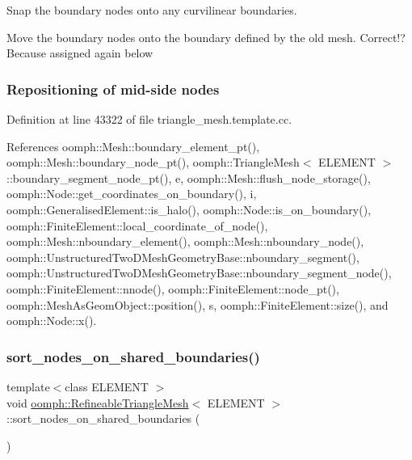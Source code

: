 Snap the boundary nodes onto any curvilinear boundaries. 

Move the boundary nodes onto the boundary defined by the old mesh. Correct!? Because assigned again below 

 \subsubsection*{Repositioning of mid-\/side nodes }

Definition at line 43322 of file triangle\+\_\+mesh.\+template.\+cc.



References oomph\+::\+Mesh\+::boundary\+\_\+element\+\_\+pt(), oomph\+::\+Mesh\+::boundary\+\_\+node\+\_\+pt(), oomph\+::\+Triangle\+Mesh$<$ E\+L\+E\+M\+E\+N\+T $>$\+::boundary\+\_\+segment\+\_\+node\+\_\+pt(), e, oomph\+::\+Mesh\+::flush\+\_\+node\+\_\+storage(), oomph\+::\+Node\+::get\+\_\+coordinates\+\_\+on\+\_\+boundary(), i, oomph\+::\+Generalised\+Element\+::is\+\_\+halo(), oomph\+::\+Node\+::is\+\_\+on\+\_\+boundary(), oomph\+::\+Finite\+Element\+::local\+\_\+coordinate\+\_\+of\+\_\+node(), oomph\+::\+Mesh\+::nboundary\+\_\+element(), oomph\+::\+Mesh\+::nboundary\+\_\+node(), oomph\+::\+Unstructured\+Two\+D\+Mesh\+Geometry\+Base\+::nboundary\+\_\+segment(), oomph\+::\+Unstructured\+Two\+D\+Mesh\+Geometry\+Base\+::nboundary\+\_\+segment\+\_\+node(), oomph\+::\+Finite\+Element\+::nnode(), oomph\+::\+Finite\+Element\+::node\+\_\+pt(), oomph\+::\+Mesh\+As\+Geom\+Object\+::position(), s, oomph\+::\+Finite\+Element\+::size(), and oomph\+::\+Node\+::x().

\mbox{\label{classoomph_1_1RefineableTriangleMesh_a6ba5b8344a33bc5ad28e4bc5e8e59cb0}} 
\subsubsection{\texorpdfstring{sort\+\_\+nodes\+\_\+on\+\_\+shared\+\_\+boundaries()}{sort\_nodes\_on\_shared\_boundaries()}}
{\footnotesize\ttfamily template$<$class E\+L\+E\+M\+E\+NT $>$ \\
void \hyperlink{classoomph_1_1RefineableTriangleMesh}{oomph\+::\+Refineable\+Triangle\+Mesh}$<$ E\+L\+E\+M\+E\+NT $>$\+::sort\+\_\+nodes\+\_\+on\+\_\+shared\+\_\+boundaries (\begin{DoxyParamCaption}{ }\end{DoxyParamCaption})\hspace{0.3cm}{\ttfamily [protected]}}




